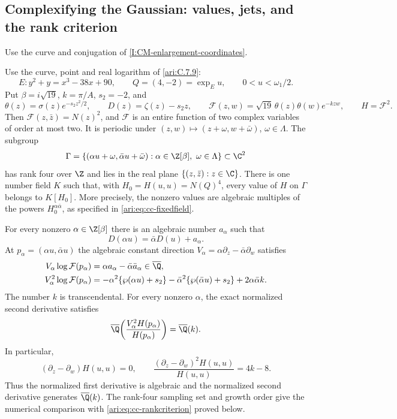 \subsection{Complexifying the Gaussian: values, jets, and the rank criterion}

Use the curve and conjugation of
\cref{I:CM-enlargement-coordinates}.

\begin{proposition}\hypertarget{tag-0019}{}\label{ari:C.7.11}

Use the curve, point and real logarithm of \ref{ari:C.7.9}:
\[
 E:y^2+y=x^3-38x+90,\qquad Q=(4,-2)=\exp_Eu,
 \qquad 0<u<\omega_1/2.
\]
Put $\beta=i\sqrt{19}$, $k=\pi/A$, $s_2=-2$, and
\[
 \theta(z)=\sigma(z)e^{-s_2z^2/2},\qquad
 D(z)=\zeta(z)-s_2z,\qquad
 \mathcal F(z,w)=\sqrt{19}\,\theta(z)\theta(w)e^{-kzw},
 \qquad H=\mathcal F^2.
\]
Then $\mathcal F(z,\bar z)=N(z)^2$, and $\mathcal F$ is an
entire function of two complex variables of order at most two.
It is periodic under $(z,w)\mapsto(z+\omega,w+\bar\omega)$,
$\omega\in\Lambda$. The subgroup
\[
 \Gamma=\{(\alpha u+\omega,\bar\alpha u+\bar\omega):
                   \alpha\in\Z[\beta],\ \omega\in\Lambda\}
 \subset\C^2
\]
has rank four over $\Z$ and lies in the real plane
$\{(z,\bar z):z\in\C\}$. There is one number field $K$ such
that, with $H_0=H(u,u)=N(Q)^4$, every value of $H$ on
$\Gamma$ belongs to $K[H_0]$. More precisely, the nonzero values
are algebraic multiples of the powers $H_0^{\alpha\bar\alpha}$,
as specified in \eqref{ari:eq:cc-fixedfield}.

For every nonzero $\alpha\in\Z[\beta]$ there is an algebraic
number $a_\alpha$ such that
\[
 D(\alpha u)=\bar\alpha D(u)+a_\alpha.
\]
At $p_\alpha=(\alpha u,\bar\alpha u)$ the algebraic constant
direction $V_\alpha=\alpha\partial_z-\bar\alpha\partial_w$
satisfies
\begin{align*}
 V_\alpha\log\mathcal F(p_\alpha)
    &=\alpha a_\alpha-\bar\alpha\bar a_\alpha
                         \in\overline{\Q},\\
 V_\alpha^2\log\mathcal F(p_\alpha)
    &=-\alpha^2\{\wp(\alpha u)+s_2\}
      -\bar\alpha^2\{\wp(\bar\alpha u)+s_2\}
      +2\alpha\bar\alpha k.
\end{align*}
The number $k$ is transcendental. For every nonzero $\alpha$,
the exact normalized second derivative satisfies
\[
 \overline\Q\!\left(\frac{V_\alpha^2H(p_\alpha)}{H(p_\alpha)}\right)
      =\overline\Q(k).
\] In particular,
\[
 (\partial_z-\partial_w)H(u,u)=0,\qquad
 \frac{(\partial_z-\partial_w)^2H(u,u)}{H(u,u)}=4k-8.
\]
Thus the normalized first derivative is algebraic and the
normalized second derivative generates $\overline\Q(k)$. The rank-four sampling set and growth order give the numerical
comparison with \eqref{ari:eq:cc-rankcriterion} proved below.
\end{proposition}



